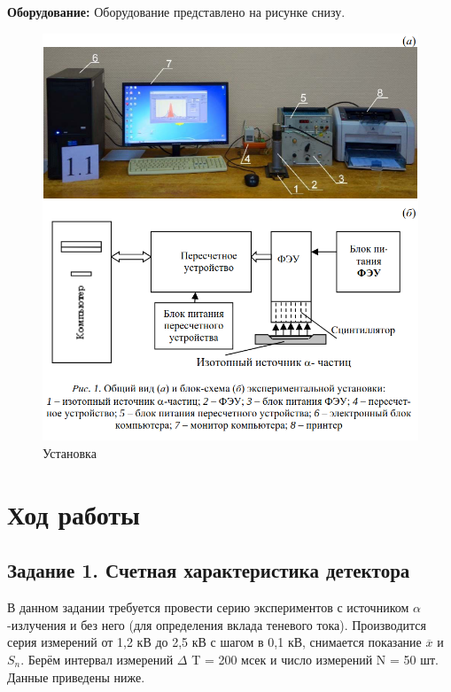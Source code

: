 \documentclass[a4paper,12pt]{article}
\begin{document}
\textbf{Оборудование:} Оборудование представлено на рисунке снизу.
\begin{figure}[ht!]
    \centering
    \includegraphics[scale=0.7]{scheme_1.png}
    \caption{Установка}
\end{figure}

\newpage
\section{Ход работы}
\subsection{Задание 1. Счетная характеристика детектора}
\hspace{\parindent} В данном задании требуется провести серию экспериментов с источником $\alpha$-излучения и без него (для определения вклада теневого тока). Производится серия измерений от 1,2 кВ до 2,5 кВ с шагом в 0,1 кВ, снимается показание $\overline{x}$ и $S_n$. Берём интервал измерений $\Delta$ T = 200 мсек и число измерений N = 50 шт. Данные приведены ниже.
\end{document}
